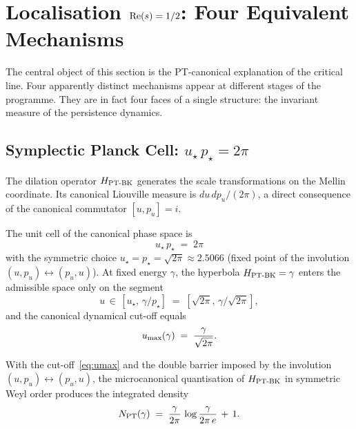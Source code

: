 \section{Localisation $\operatorname{Re}(s) = 1/2$: Four Equivalent Mechanisms}
\label{sec:localisation_critique}

The central object of this section is the PT-canonical explanation of the
critical line. Four apparently distinct mechanisms appear at different
stages of the programme. They are in fact four faces of a single
structure: the invariant measure of the persistence dynamics.

\subsection{Symplectic Planck Cell: $u_\star\,p_\star = 2\pi$}
\label{sec:cellule_planck}

The dilation operator $H_{\mathrm{PT\text{-}BK}}$ generates the scale transformations on
the Mellin coordinate. Its canonical Liouville measure is
$du\,dp_u / (2\pi)$, a direct consequence of the canonical commutator
$[u, p_u] = i$.

\begin{proposition}
\label{prop:cellule_planck}
The unit cell of the canonical phase space is
\begin{equation}
\boxed{\;u_\star\, p_\star \;=\; 2\pi\;}
\label{eq:cellule_planck}
\end{equation}
with the symmetric choice
$u_\star = p_\star = \sqrt{2\pi} \approx 2.5066$ (fixed point of the
involution $(u, p_u) \leftrightarrow (p_u, u)$). At fixed energy $\gamma$,
the hyperbola $H_{\mathrm{PT\text{-}BK}} = \gamma$ enters the admissible space only
on the segment
\[
u \,\in\, [u_\star,\, \gamma/p_\star] \;=\; [\sqrt{2\pi},\, \gamma/\sqrt{2\pi}],
\]
and the canonical dynamical cut-off equals
\begin{equation}
u_{\max}(\gamma) \;=\; \dfrac{\gamma}{\sqrt{2\pi}}.
\label{eq:umax}
\end{equation}
\end{proposition}

\begin{proposition}
\label{prop:densite_NPT}
With the cut-off~\eqref{eq:umax} and the double barrier imposed by
the involution $(u, p_u) \leftrightarrow (p_u, u)$, the microcanonical
quantisation of $H_{\mathrm{PT\text{-}BK}}$ in symmetric Weyl order produces the integrated
density
\begin{equation}
N_{\mathrm{PT}}(\gamma) \;=\; \dfrac{\gamma}{2\pi}\,\log\dfrac{\gamma}{2\pi\,e} \,+\, 1.
\label{eq:NPT}
\end{equation}
\end{proposition}
\label{sec:densite_semi_classique}

